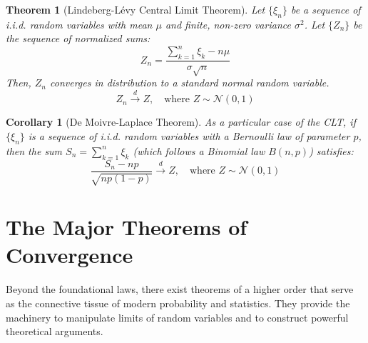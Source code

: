 \documentclass[12pt, openany]{book}
\theoremstyle{definition}
\theoremstyle{plain}
\newtheorem{theorem}[definition]{Theorem}
\newtheorem{corollary}[definition]{Corollary}
\theoremstyle{remark}
\begin{document}
\begin{theorem}[Lindeberg-Lévy Central Limit Theorem]
Let $\{\xi_n\}$ be a sequence of i.i.d. random variables with mean $\mu$ and finite, non-zero variance $\sigma^2$. Let $\{Z_n\}$ be the sequence of normalized sums:
$$ Z_n = \frac{\sum_{k=1}^n \xi_k - n\mu}{\sigma\sqrt{n}} $$
Then, $Z_n$ converges in distribution to a standard normal random variable.
$$ Z_n \xrightarrow{d} Z, \quad \text{where } Z \sim \mathcal{N}(0,1) $$
\end{theorem}

\begin{corollary}[De Moivre-Laplace Theorem]
As a particular case of the CLT, if $\{\xi_n\}$ is a sequence of i.i.d. random variables with a Bernoulli law of parameter $p$, then the sum $S_n = \sum_{k=1}^n \xi_k$ (which follows a Binomial law $B(n,p)$) satisfies:
$$ \frac{S_n - np}{\sqrt{np(1-p)}} \xrightarrow{d} Z, \quad \text{where } Z \sim \mathcal{N}(0,1) $$
\end{corollary}


\section{The Major Theorems of Convergence}

Beyond the foundational laws, there exist theorems of a higher order that serve as the connective tissue of modern probability and statistics. They provide the machinery to manipulate limits of random variables and to construct powerful theoretical arguments.
\end{document}

